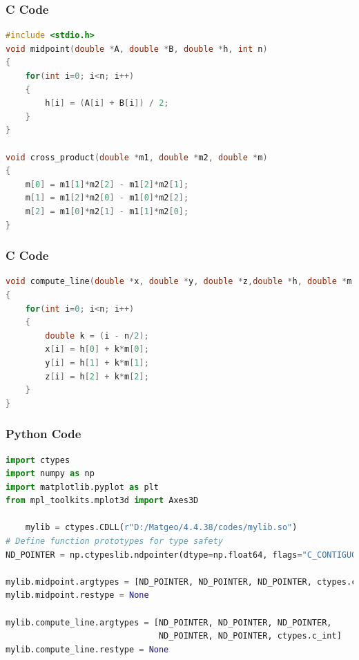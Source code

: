 \documentclass{beamer}
\begin{document}
\begin{frame}[fragile]
  \frametitle{C Code}
  \begin{lstlisting}[language=C]
#include <stdio.h>
void midpoint(double *A, double *B, double *h, int n)
{
    for(int i=0; i<n; i++)
    {
        h[i] = (A[i] + B[i]) / 2;
    }
}

void cross_product(double *m1, double *m2, double *m)
{
    m[0] = m1[1]*m2[2] - m1[2]*m2[1];
    m[1] = m1[2]*m2[0] - m1[0]*m2[2];
    m[2] = m1[0]*m2[1] - m1[1]*m2[0];
}
  \end{lstlisting}
\end{frame}
\begin{frame}[fragile]
  \frametitle{C Code}
  \begin{lstlisting}[language=C]
void compute_line(double *x, double *y, double *z,double *h, double *m,                      int n)
{
    for(int i=0; i<n; i++)
    {
        double k = (i - n/2);  
        x[i] = h[0] + k*m[0];
        y[i] = h[1] + k*m[1];
        z[i] = h[2] + k*m[2];
    }
}
  \end{lstlisting}
\end{frame}


\begin{frame}[fragile]
  \frametitle{Python Code}
  \begin{lstlisting}[language=Python]
import ctypes
import numpy as np
import matplotlib.pyplot as plt
from mpl_toolkits.mplot3d import Axes3D

    mylib = ctypes.CDLL(r"D:/Matgeo/4.4.38/codes/mylib.so")
# Define function prototypes for type safety
ND_POINTER = np.ctypeslib.ndpointer(dtype=np.float64, flags="C_CONTIGUOUS")

mylib.midpoint.argtypes = [ND_POINTER, ND_POINTER, ND_POINTER, ctypes.c_int]
mylib.midpoint.restype = None

mylib.compute_line.argtypes = [ND_POINTER, ND_POINTER, ND_POINTER, 
                               ND_POINTER, ND_POINTER, ctypes.c_int]
mylib.compute_line.restype = None
  \end{lstlisting}
\end{frame}
\end{document}
